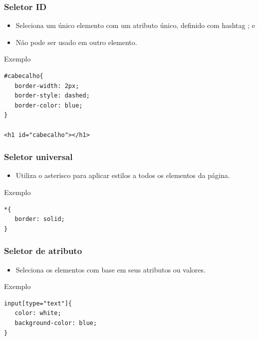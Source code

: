 \documentclass[aspectratio=169]{beamer} %
\begin{document}
\begin{frame}[fragile]
	\frametitle{Seletor ID}
	
	\begin{itemize}
		\item Seleciona um único elemento com um atributo  único, definido com hashtag \structure{\#} ; e
		\item \alert{Não pode ser usado em outro elemento}.
	\end{itemize}\vfill
	
	\begin{exampleblock}{Exemplo}
		\begin{lstlisting}
#cabecalho{
   border-width: 2px;
   border-style: dashed;
   border-color: blue;
}

<h1 id="cabecalho"></h1>			
		\end{lstlisting}
	\end{exampleblock}
\end{frame}

\begin{frame}[fragile]
	\frametitle{Seletor universal}
	
	\begin{itemize}
		\item Utiliza o asterisco \structure{*} para aplicar estilos a todos os elementos da página.
	\end{itemize}\vfill
	
	\begin{exampleblock}{Exemplo}
		\begin{lstlisting}
*{
   border: solid;
}			
		\end{lstlisting}
	\end{exampleblock}
\end{frame}

\begin{frame}[fragile]
	\frametitle{Seletor de atributo}
	
	\begin{itemize}
		\item Seleciona os elementos com base em seus atributos ou valores.
	\end{itemize}\vfill
	
	\begin{exampleblock}{Exemplo}
		\begin{lstlisting}
input[type="text"]{
   color: white;
   background-color: blue;
}			
		\end{lstlisting}
	\end{exampleblock}
\end{frame}
\end{document}
